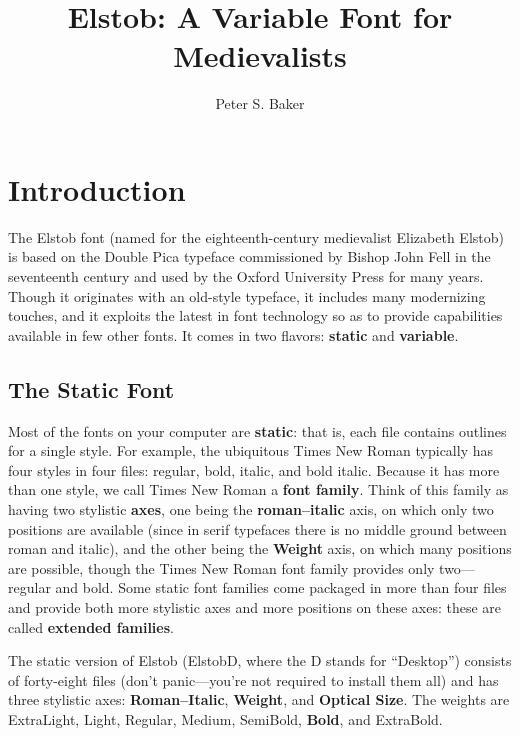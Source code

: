 \documentclass[12pt,letterpaper,openany]{book}
\title{Elstob: A Variable Font for Medievalists}
\author{Peter S. Baker}
\begin{document}
\maketitle

\chapter{Introduction}

\pagestyle{fancy}

The Elstob font (named for the eighteenth-century medievalist Elizabeth Elstob)
is based on the Double Pica typeface commissioned by Bishop John Fell in the
seventeenth century and used by the Oxford University Press for many years.
Though it originates with an old-style typeface, it includes many modernizing touches,
and it exploits the latest in font technology so as to provide capabilities
available in few other fonts. It comes in two flavors: \textbf{static} and
\textbf{variable}.

\section{The Static Font}

Most of the fonts on your
computer are \textbf{static}: that is, each file contains outlines for a single style.
For example, the ubiquitous Times New Roman typically has four styles in four
files: regular, bold, italic, and bold italic. Because it has more than one
style, we call Times New Roman a \textbf{font family}. Think of this family as
having two stylistic \textbf{axes}, one being the \textbf{roman--italic} axis, on which
only two positions are available (since in serif typefaces there is no middle
ground between roman and italic), and
the other being the \textbf{Weight} axis, on which many positions are possible,
though the Times New Roman font family provides only two---regular and bold.
Some static font families come packaged in more than four files and provide both more
stylistic axes and more positions on these axes: these are called \textbf{extended
families}.

The static version of Elstob (ElstobD, where the D stands for “Desktop”) consists
of forty-eight files (don’t panic---you’re not required to install them all) and
has three stylistic
axes: \textbf{Roman--Italic}, \textbf{Weight}, and \textbf{Optical Size}. The
weights are {\extralight ExtraLight}, {\light Light}, Regular, {\medium Medium},
{\semibold SemiBold}, \textbf{Bold}, and {\extrabold ExtraBold}.
\end{document}
